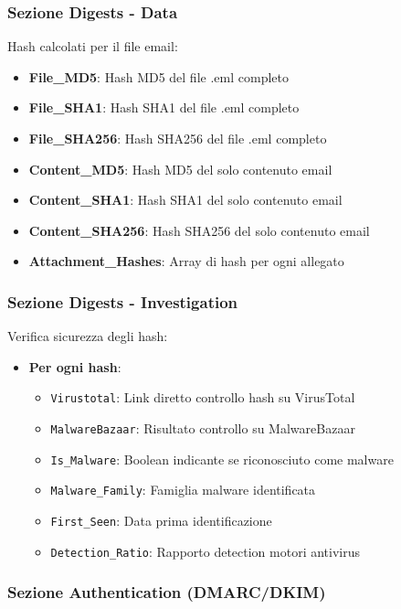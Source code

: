 \documentclass{article}
\begin{document}
\subsubsection{Sezione Digests - Data}

Hash calcolati per il file email:

\begin{itemize}
    \item \textbf{File\_MD5}: Hash MD5 del file .eml completo
    \item \textbf{File\_SHA1}: Hash SHA1 del file .eml completo  
    \item \textbf{File\_SHA256}: Hash SHA256 del file .eml completo
    \item \textbf{Content\_MD5}: Hash MD5 del solo contenuto email
    \item \textbf{Content\_SHA1}: Hash SHA1 del solo contenuto email
    \item \textbf{Content\_SHA256}: Hash SHA256 del solo contenuto email
    \item \textbf{Attachment\_Hashes}: Array di hash per ogni allegato
\end{itemize}

\subsubsection{Sezione Digests - Investigation}

Verifica sicurezza degli hash:

\begin{itemize}
    \item \textbf{Per ogni hash}:
    \begin{itemize}
        \item \texttt{Virustotal}: Link diretto controllo hash su VirusTotal
        \item \texttt{MalwareBazaar}: Risultato controllo su MalwareBazaar
        \item \texttt{Is\_Malware}: Boolean indicante se riconosciuto come malware
        \item \texttt{Malware\_Family}: Famiglia malware identificata
        \item \texttt{First\_Seen}: Data prima identificazione
        \item \texttt{Detection\_Ratio}: Rapporto detection motori antivirus
    \end{itemize}
\end{itemize}

\subsubsection{Sezione Authentication (DMARC/DKIM)}
\end{document}
